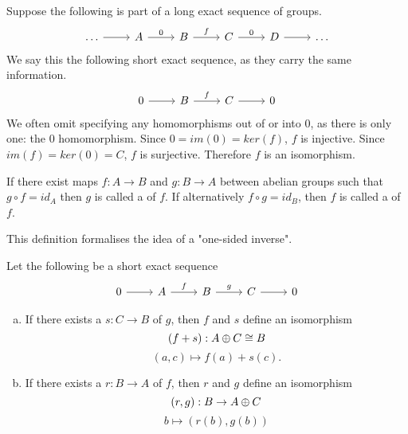 \begin{example}
Suppose the following is part of a long exact sequence of groups.
\[\begin{tikzcd}
\dots \arrow[r] & A \arrow[r, "0"] & B \arrow[r, "f"] & C \arrow[r, "0"] & D \arrow[r] & \dots
\end{tikzcd}\]
We say this  the following short exact sequence, as they carry the same information.
\[\begin{tikzcd}
0 \arrow[r] & B \arrow[r, "f"] & C \arrow[r] & 0
\end{tikzcd}\]
We often omit specifying any homomorphisms out of or into $0$, as there is only one: the $0$ homomorphism. Since $0=im(0)=ker(f)$, $f$ is injective. Since $im(f)=ker(0)=C$, $f$ is surjective. Therefore $f$ is an isomorphism.
\end{example}

\begin{definition}
If there exist maps $f:A\rightarrow B$ and $g:B\rightarrow A$ between abelian groups such that $g\circ f = id_A$ then $g$ is called a  of $f$. If alternatively $f\circ g=id_B$, then $f$ is called a  of $f$.
\end{definition}
This definition formalises the idea of a "one-sided inverse".

\begin{prop}\label{short-seq-direct-sum}
Let the following be a short exact sequence
\[\begin{tikzcd}
0 \arrow[r] & A \arrow[r, "f"] & B \arrow[r, "g"] & C \arrow[r] & 0
\end{tikzcd}\]
\begin{enumerate}[(a)]
    \item If there exists a  $s:C\rightarrow B$ of $g$, then $f$ and $s$ define an isomorphism $$(f+s):A\oplus C\cong B$$
$$(a,c)\mapsto f(a)+s(c).$$
\item If there exists a  $r:B\rightarrow A$ of $f$, then $r$ and $g$ define an isomorphism $$(r,g):B\rightarrow A\oplus C$$
$$b\mapsto (r(b),g(b))$$
\end{enumerate}
\end{prop}

